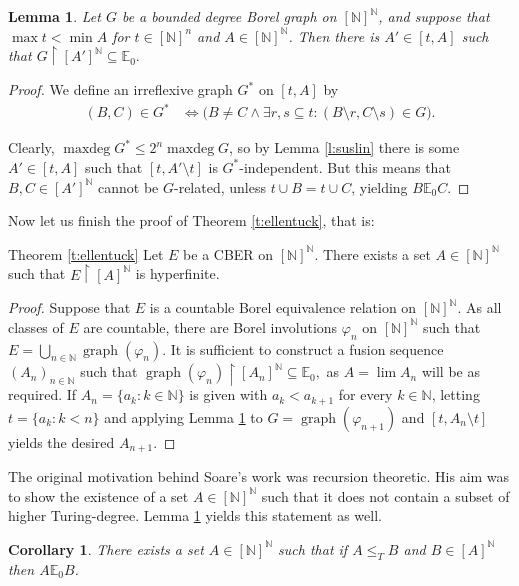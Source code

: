 \documentclass[11pt]{amsart}
\newcommand{\thistheoremname}{}
\newtheorem*{genericthm*}{\thistheoremname}
\newenvironment{namedthm*}[1]
{\renewcommand{\thistheoremname}{#1}%
	\begin{genericthm*}}
	{\end{genericthm*}}
\newcommand{\N}{\mathbb{N}}
\renewcommand{\restriction}[2]{#1 \upharpoonright #2}
\newtheorem{lemma}[theorem]{Lemma}
\newtheorem{corollary}[theorem]{Corollary}
\theoremstyle{definition}
\numberwithin{equation}{section}
\DeclareMathOperator{\maxdeg}{maxdeg}
\DeclareMathOperator{\graph}{graph}
\newcommand{\rstr}{\restriction}
\newcommand{\vfi}{\varphi}
\begin{document}
	\begin{lemma}
		\label{l:indep2} Let $G$ be a bounded degree Borel graph on $[\N]^\N$, and suppose that $\max t<\min A$ for $t \in [\N]^n$ and $A\in [\N]^\N$. Then there is $A' \in [t,A]$ such that $\restriction{G}{[A']^\N} \subseteq \mathbb{E}_0.$
	\end{lemma}
	\begin{proof}
		We define an irreflexive graph $G^*$ on $[t,A]$ by 
		\begin{align*}
		(B,C)\in G^*&\iff \big(B\ne C \land \exists r,s \subseteq t: (B \setminus r,C \setminus s)\in G\big).
		\end{align*}
		
		Clearly, $\maxdeg G^* \leq 2^{n} \maxdeg G$, so by Lemma \ref{l:suslin} there is some $A' \in[t,A]$ such that $[t,A'\setminus t]$ is $G^*$-independent. But this means that $B,C \in [A']^\N$ cannot be $G$-related, unless $t \cup B=t \cup C$, yielding $B \mathbb{E}_0 C$.
	\end{proof}
	Now let us finish the proof of Theorem \ref{t:ellentuck}, that is:
	\begin{namedthm*}{Theorem \ref{t:ellentuck}}
			Let $E$ be a CBER on $[\N]^\N$. There exists a set $A \in [\N]^\N$ such that $\restriction{E}{[A]^\N}$ is hyperfinite. 
	\end{namedthm*}
	\begin{proof}
		Suppose that $E$ is a countable Borel equivalence relation on $[\N]^\N$. As all classes of $E$ are countable, there are Borel involutions $\vfi_n$ on $[\N]^\N$ such that $E=\bigcup_{n\in\N}\graph(\vfi_n)$. It is sufficient to construct a fusion sequence $(A_n)_{n\in\N}$ such that $\rstr{\graph(\vfi_n)}{[A_n]^\N} \subseteq\mathbb{E}_0,$ as $A=\lim A_n$ will be as required. If $A_n=\{a_k:k\in\N\}$ is given with $a_k<a_{k+1}$ for every $k\in\N$, letting $t=\{a_k:k<n\}$ and applying Lemma \ref{l:indep2} to $G=\graph(\varphi_{n+1})$ and $[t,A_n\setminus t]$ yields the desired $A_{n+1}$.
	\end{proof}
	
	The original motivation behind Soare's work was recursion theoretic. His aim was to show the existence of a set $A \in [\N]^\N$ such that it does not contain a subset of higher Turing-degree. Lemma \ref{l:indep2} yields this statement as well.
	
	\begin{corollary}
		There exists a set $A\in[\N]^\N$ such that if $A \leq_T B$ and $B \in [A]^\N$ then $A \mathbb{E}_0 B$.
	\end{corollary}
	
\end{document}
